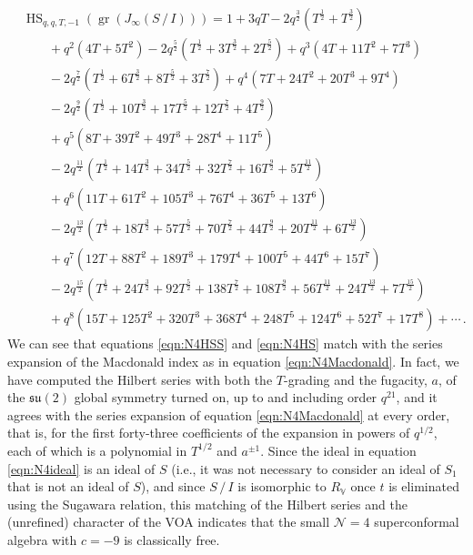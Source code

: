 \documentclass[12pt]{article}
\numberwithin{equation}{section}
\numberwithin{figure}{section}
\theoremstyle{plain}
\theoremstyle{definition}
\begin{document}
\begin{equation}\label{eqn:N4HS}
\begin{aligned}
    &\operatorname{HS}_{q,q,T,-1}(\operatorname{gr}(J_{\infty}(S \, / \,  I))) = 1 + 3qT
- 2q^{\frac{3}{2}}\left(T^{\frac{1}{2}} + T^{\frac{3}{2}}\right)
\\&\qquad+ q^2\left(4T + 5T^2\right)
 - 2q^{\frac{5}{2}}\left(T^{\frac{1}{2}} + 3T^{\frac{3}{2}} + 2T^{\frac{5}{2}}\right)
+ q^3\left(4T + 11T^2 + 7T^3\right)
\\&\qquad- 2q^{\frac{7}{2}}\left(T^{\frac{1}{2}} + 6T^{\frac{3}{2}} + 8T^{\frac{5}{2}} + 3T^{\frac{7}{2}}\right)
+ q^4\left(7T + 24T^2 + 20T^3 + 9T^4\right)
\\&\qquad- 2q^{\frac{9}{2}}\left(T^{\frac{1}{2}} + 10T^{\frac{3}{2}} + 17T^{\frac{5}{2}} + 12T^{\frac{7}{2}} + 4T^{\frac{9}{2}}\right)
\\&\qquad+ q^5\left(8T + 39T^2 + 49T^3 + 28T^4 + 11T^5\right)
\\&\qquad - 2q^{\frac{11}{2}}\left(T^{\frac{1}{2}} + 14T^{\frac{3}{2}} + 34T^{\frac{5}{2}} + 32T^{\frac{7}{2}} + 16T^{\frac{9}{2}} + 5T^{\frac{11}{2}}\right)
\\&\qquad + q^6\left(11T + 61T^2 + 105T^3 + 76T^4 + 36T^5 + 13T^6\right) \\&\qquad - 2q^\frac{13}{2}\left(T^\frac{1}{2} + 18T^\frac{3}{2} + 57T^\frac{5}{2} + 70T^\frac{7}{2} + 44T^\frac{9}{2} + 20T^\frac{11}{2} + 6T^\frac{13}{2}\right)
\\&\qquad + q^7\left(12T + 88T^2 + 189T^3 + 179T^4 + 100T^5 + 44T^6 + 15T^7 \right)
\\&\qquad - 2q^\frac{15}{2}\left(T^\frac{1}{2} + 24T^\frac{3}{2} + 92T^\frac{5}{2} + 138T^\frac{7}{2} + 108T^\frac{9}{2} + 56T^\frac{11}{2} + 24T^\frac{13}{2} + 7T^\frac{15}{2}\right)
\\&\qquad + q^8\left(15T + 125T^2 + 320T^3 + 368T^4 + 248T^5 + 124T^6 + 52T^7 + 17T^8 \right)
+ \cdots \,.
  \end{aligned}
\end{equation}
We can see that equations \eqref{eqn:N4HSS} and \eqref{eqn:N4HS} match with the series expansion of the Macdonald index as in equation \eqref{eqn:N4Macdonald}. In fact, we have computed the Hilbert series with both the $T$-grading and the fugacity, $a$, of the $\mathfrak{su}(2)$ global symmetry turned on, up to and including order $q^{21}$, and it agrees with the series expansion of equation \eqref{eqn:N4Macdonald} at every order, that is, for the first forty-three coefficients of the expansion in powers of $q^{1/2}$, each of which is a polynomial in $T^{1/2}$ and $a^{\pm 1}$. Since the ideal in equation \eqref{eqn:N4ideal} is an ideal of $S$ (i.e., it was not necessary to consider an ideal of $S_1$ that is not an ideal of $S$), and since $S \, / \, I$ is isomorphic to $R_\mathbb{V}$ once $t$ is eliminated using the Sugawara relation, this matching of the Hilbert series and the (unrefined) character of the VOA indicates that the small $\mathcal{N}=4$ superconformal algebra with $c = -9$ is classically free.
\end{document}
